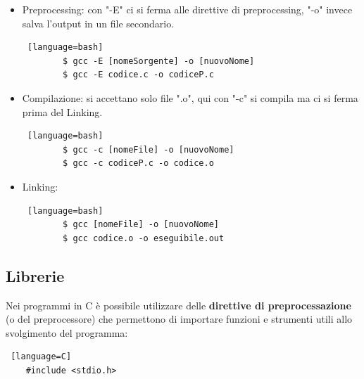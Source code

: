 \documentclass[12pt,a4paper]{article}
\begin{document}
\begin{itemize}
    \item Preprocessing: con "-E" ci si ferma alle direttive di preprocessing, "-o" invece salva l'output in un file secondario.
    \begin{lstlisting} [language=bash]
        $ gcc -E [nomeSorgente] -o [nuovoNome]
        $ gcc -E codice.c -o codiceP.c
    \end{lstlisting}
    \item Compilazione: si accettano solo file ".o", qui con "-c" si compila ma ci si ferma prima del Linking.
    \begin{lstlisting} [language=bash]
        $ gcc -c [nomeFile] -o [nuovoNome]
        $ gcc -c codiceP.c -o codice.o
    \end{lstlisting}
    \item Linking:
    \begin{lstlisting} [language=bash]
        $ gcc [nomeFile] -o [nuovoNome]
        $ gcc codice.o -o eseguibile.out
    \end{lstlisting}
\end{itemize}

\subsection{Librerie}
Nei programmi in C è possibile utilizzare delle \textbf{direttive di preprocessazione} (o del preprocessore) che permettono di importare funzioni e strumenti utili allo svolgimento del programma:
\begin{lstlisting} [language=C]
    #include <stdio.h>
\end{lstlisting}
\end{document}
